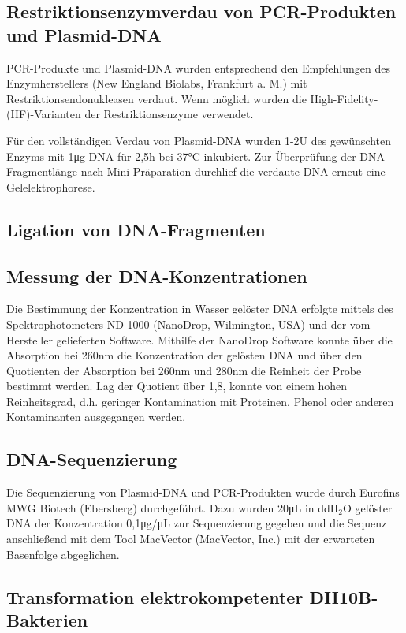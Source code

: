 \subsection{Restriktionsenzymverdau von PCR-Produkten und Plasmid-DNA}
PCR-Produkte und Plasmid-DNA wurden entsprechend den Empfehlungen des Enzymherstellers (New England Biolabs, Frankfurt a. M.) mit Restriktionsendonukleasen verdaut. Wenn möglich wurden die High-Fidelity-(HF)-Varianten der Restriktionsenzyme verwendet. 

Für den vollständigen Verdau von Plasmid-DNA wurden 1-2\si{U} des gewünschten Enzyms mit 1\si{\micro\gram} DNA für 2,5\si{\hour} bei 37\si{\celsius} inkubiert. Zur Überprüfung der DNA-Fragmentlänge nach Mini-Präparation durchlief die verdaute DNA erneut eine Gelelektrophorese. 

\subsection{Ligation von DNA-Fragmenten}

\subsection{Messung der DNA-Konzentrationen}
Die Bestimmung der Konzentration in Wasser gelöster DNA erfolgte mittels des Spektrophotometers ND-1000 (NanoDrop, Wilmington, USA) und der vom Hersteller gelieferten Software. Mithilfe der NanoDrop Software konnte über die Absorption bei 260\si{\nano\meter} die Konzentration der gelösten DNA und über den Quotienten der Absorption bei 260\si{\nano\meter} und 280\si{\nano\meter} die Reinheit der Probe bestimmt werden. Lag der Quotient über 1,8, konnte von einem hohen Reinheitsgrad, d.h. geringer Kontamination mit Proteinen, Phenol oder anderen Kontaminanten ausgegangen werden.

\subsection{DNA-Sequenzierung}
Die Sequenzierung von Plasmid-DNA und PCR-Produkten wurde durch Eurofins MWG Biotech (Ebersberg) durchgeführt. Dazu wurden 20\si{\micro\liter} in ddH$_2$O gelöster DNA der Konzentration 0,1\si{\micro\gram/\micro\liter} zur Sequenzierung gegeben und die Sequenz anschließend mit dem Tool MacVector (MacVector, Inc.) mit der erwarteten Basenfolge abgeglichen.

\subsection{Transformation elektrokompetenter DH10B-Bakterien}

